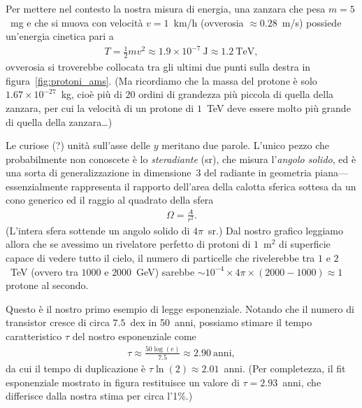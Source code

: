 Per mettere nel contesto la nostra misura di energia, una zanzara che pesa
$m = 5$~mg e che si muova con velocità $v = 1$~km/h (ovverosia $\approx 0.28$~m/s)
possiede un'energia cinetica pari a
\begin{align*}
  T = \frac{1}{2}mv^2 \approx 1.9 \times 10^{-7}~\text{J} \approx 1.2~\text{TeV},
\end{align*}
ovverosia si troverebbe collocata tra gli ultimi due punti sulla destra in
figura~\ref{fig:protoni_ams}. (Ma ricordiamo che la massa del protone è solo
$1.67 \times 10^{-27}$~kg, cioè più di $20$ ordini di grandezza più piccola
di quella della zanzara, per cui la velocità di un protone di $1$~TeV deve
essere molto più grande di quella della zanzara\ldots)

Le curiose (?) unità sull'asse delle $y$ meritano due parole. L'unico pezzo che
probabilmente non conoscete è lo \emph{steradiante} (sr), che misura
l'\emph{angolo solido}, ed è una sorta di generalizzazione in dimensione~3
del radiante in geometria piana---essenzialmente rappresenta il rapporto
dell'area della calotta sferica sottesa da un cono generico ed il raggio al
quadrato della sfera
\begin{align*}
  \Omega = \frac{A}{r^2}.
\end{align*}
(L'intera sfera sottende un angolo solido di $4\pi$~sr.) Dal nostro grafico leggiamo
allora che se avessimo un rivelatore perfetto di protoni di $1$~m$^2$ di superficie capace
di vedere tutto il cielo, il numero di particelle che rivelerebbe tra $1$ e $2$~TeV
(ovvero tra $1000$ e $2000$~GeV) sarebbe
$\sim 10^{-4} \times 4\pi \times (2000 - 1000) \approx 1$ protone al secondo.




Questo è il nostro primo esempio di legge esponenziale. Notando che il numero
di transistor cresce di circa $7.5$~dex in 50~anni, possiamo stimare il tempo
caratteristico $\tau$ del nostro esponenziale come
\begin{align*}
  \tau \approx \frac{50 \log(e)}{7.5} \approx 2.90~\text{anni},
\end{align*}
da cui il tempo di duplicazione è $\tau \ln(2) \approx 2.01$~anni. (Per completezza,
il fit esponenziale mostrato in figura restituisce un valore di $\tau = 2.93$~anni,
che differisce dalla nostra stima per circa l'1\%.)

